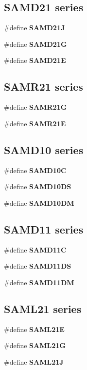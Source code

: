 \subsection*{S\-A\-M\-D21 series}
\begin{DoxyCompactItemize}
\item 
\#define {\bfseries S\-A\-M\-D21\-J}
\item 
\#define {\bfseries S\-A\-M\-D21\-G}
\item 
\#define {\bfseries S\-A\-M\-D21\-E}
\end{DoxyCompactItemize}
\subsection*{S\-A\-M\-R21 series}
\begin{DoxyCompactItemize}
\item 
\#define {\bfseries S\-A\-M\-R21\-G}
\item 
\#define {\bfseries S\-A\-M\-R21\-E}
\end{DoxyCompactItemize}
\subsection*{S\-A\-M\-D10 series}
\begin{DoxyCompactItemize}
\item 
\#define {\bfseries S\-A\-M\-D10\-C}
\item 
\#define {\bfseries S\-A\-M\-D10\-D\-S}
\item 
\#define {\bfseries S\-A\-M\-D10\-D\-M}
\end{DoxyCompactItemize}
\subsection*{S\-A\-M\-D11 series}
\begin{DoxyCompactItemize}
\item 
\#define {\bfseries S\-A\-M\-D11\-C}
\item 
\#define {\bfseries S\-A\-M\-D11\-D\-S}
\item 
\#define {\bfseries S\-A\-M\-D11\-D\-M}
\end{DoxyCompactItemize}
\subsection*{S\-A\-M\-L21 series}
\begin{DoxyCompactItemize}
\item 
\#define {\bfseries S\-A\-M\-L21\-E}
\item 
\#define {\bfseries S\-A\-M\-L21\-G}
\item 
\#define {\bfseries S\-A\-M\-L21\-J}
\end{DoxyCompactItemize}
